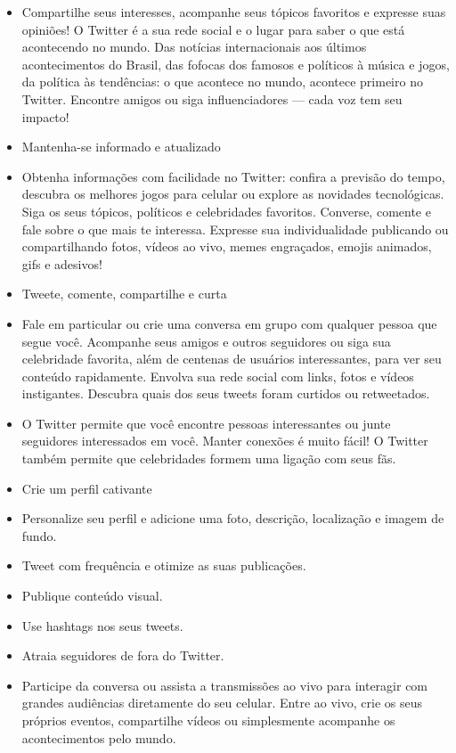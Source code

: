 \begin{itemize}
\item Compartilhe seus interesses, acompanhe seus tópicos favoritos e expresse suas opiniões! O Twitter é a sua rede social e o lugar para saber o que está acontecendo no mundo. Das notícias internacionais aos últimos acontecimentos do Brasil, das fofocas dos famosos e políticos à música e jogos, da política às tendências: o que acontece no mundo, acontece primeiro no Twitter. Encontre amigos ou siga influenciadores — cada voz tem seu impacto!

\item Mantenha-se informado e atualizado

\item Obtenha informações com facilidade no Twitter: confira a previsão do tempo, descubra os melhores jogos para celular ou explore as novidades tecnológicas. Siga os seus tópicos, políticos e celebridades favoritos. Converse, comente e fale sobre o que mais te interessa. Expresse sua individualidade publicando ou compartilhando fotos, vídeos ao vivo, memes engraçados, emojis animados, gifs e adesivos!

\item Tweete, comente, compartilhe e curta

\item Fale em particular ou crie uma conversa em grupo com qualquer pessoa que segue você. Acompanhe seus amigos e outros seguidores ou siga sua celebridade favorita, além de centenas de usuários interessantes, para ver seu conteúdo rapidamente. Envolva sua rede social com links, fotos e vídeos instigantes. Descubra quais dos seus tweets foram curtidos ou retweetados.

\item O Twitter permite que você encontre pessoas interessantes ou junte seguidores interessados em você. Manter conexões é muito fácil! O Twitter também permite que celebridades formem uma ligação com seus fãs.

\item Crie um perfil cativante

\item Personalize seu perfil e adicione uma foto, descrição, localização e imagem de fundo.

\item Tweet com frequência e otimize as suas publicações.

\item Publique conteúdo visual.

\item Use hashtags nos seus tweets.

\item Atraia seguidores de fora do Twitter.

\item Participe da conversa ou assista a transmissões ao vivo para interagir com grandes audiências diretamente do seu celular. Entre ao vivo, crie os seus próprios eventos, compartilhe vídeos ou simplesmente acompanhe os acontecimentos pelo mundo.

\end{itemize}


